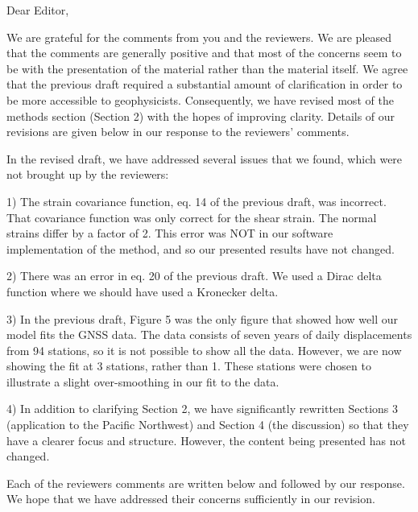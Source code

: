 \documentclass[10pt,a4paper]{letter}
\begin{document}
\signature{Trever T. Hines}

\begin{letter}{}
\opening{Dear Editor,}






We are grateful for the comments from you and the reviewers. We are
pleased that the comments are generally positive and that most of the
concerns seem to be with the presentation of the material rather than
the material itself. We agree that the previous draft required a
substantial amount of clarification in order to be more accessible to
geophysicists. Consequently, we have revised most of the methods
section (Section 2) with the hopes of improving clarity. Details of
our revisions are given below in our response to the reviewers'
comments.

In the revised draft, we have addressed several issues that we found,
which were not brought up by the reviewers:

1) The strain covariance function, eq. 14 of the previous draft, was
incorrect. That covariance function was only correct for the shear
strain. The normal strains differ by a factor of 2. This error was NOT
in our software implementation of the method, and so our presented
results have not changed.

2) There was an error in eq. 20 of the previous draft. We used a Dirac
delta function where we should have used a Kronecker delta.

3) In the previous draft, Figure 5 was the only figure that showed how
well our model fits the GNSS data. The data consists of seven years of
daily displacements from 94 stations, so it is not possible to show
all the data. However, we are now showing the fit at 3 stations,
rather than 1. These stations were chosen to illustrate a slight
over-smoothing in our fit to the data.

4) In addition to clarifying Section 2, we have significantly
rewritten Sections 3 (application to the Pacific Northwest) and
Section 4 (the discussion) so that they have a clearer focus and
structure. However, the content being presented has not changed.

Each of the reviewers comments are written below and followed by our
response. We hope that we have addressed their concerns sufficiently
in our revision.


\end{letter}
\end{document}
